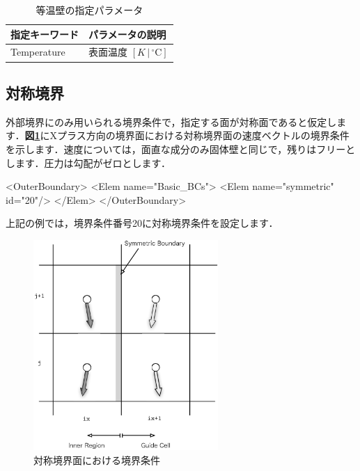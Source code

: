 \begin{table}[htdp]
\caption{等温壁の指定パラメータ}
\begin{center}
\small
\begin{tabular}{ll} \toprule
指定キーワード & パラメータの説明\\ \midrule
Temperature & 表面温度 $[K\,|\,{}^\circ\mathrm{C}]$\\
\bottomrule
\end{tabular}
\end{center}
\label{tbl:iso-thermal}
\end{table}


\pagebreak
\subsection{対称境界}

外部境界にのみ用いられる境界条件で，指定する面が対称面であると仮定します．\textbf{図\ref{fig:symmetric plane}}にXプラス方向の境界面における対称境界面の速度ベクトルの境界条件を示します．速度については，面直な成分のみ固体壁と同じで，残りはフリーとします．圧力は勾配がゼロとします．


{\small
\begin{program}
<OuterBoundary>
  <Elem name="Basic_BCs">
    <Elem name="symmetric" id="20"/>
  </Elem>
</OuterBoundary>
\end{program}
}


上記の例では，境界条件番号20に対称境界条件を設定します．

\begin{figure}[htbp]
\begin{center}
\includegraphics[width=7cm,clip]{symmetric.eps}
\end{center}
\caption{対称境界面における境界条件}
\label{fig:symmetric plane}
\end{figure}

